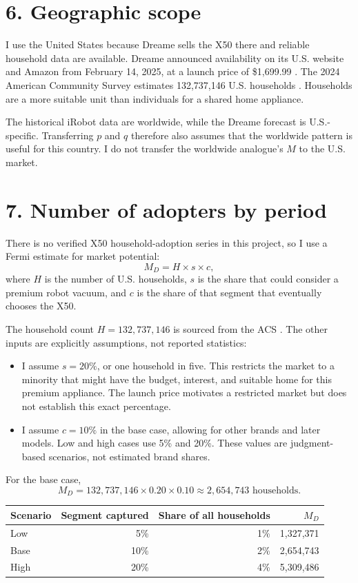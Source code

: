 \documentclass[11pt,a4paper]{article}
\begin{document}
\section*{6. Geographic scope}
I use the United States because Dreame sells the X50 there and reliable household data are available. Dreame announced availability on its U.S. website and Amazon from February 14, 2025, at a launch price of \$1,699.99 \cite{S18}. The 2024 American Community Survey estimates 132,737,146 U.S. households \cite{S17}. Households are a more suitable unit than individuals for a shared home appliance.

The historical iRobot data are worldwide, while the Dreame forecast is U.S.-specific. Transferring $p$ and $q$ therefore also assumes that the worldwide pattern is useful for this country. I do not transfer the worldwide analogue's $M$ to the U.S. market.

\section*{7. Number of adopters by period}
There is no verified X50 household-adoption series in this project, so I use a Fermi estimate for market potential:
\[
M_D=H\times s\times c,
\]
where $H$ is the number of U.S. households, $s$ is the share that could consider a premium robot vacuum, and $c$ is the share of that segment that eventually chooses the X50.

The household count $H=132{,}737{,}146$ is sourced from the ACS \cite{S17}. The other inputs are explicitly assumptions, not reported statistics:
\begin{itemize}
\item I assume $s=20\%$, or one household in five. This restricts the market to a minority that might have the budget, interest, and suitable home for this premium appliance. The launch price motivates a restricted market but does not establish this exact percentage.
\item I assume $c=10\%$ in the base case, allowing for other brands and later models. Low and high cases use 5\% and 20\%. These values are judgment-based scenarios, not estimated brand shares.
\end{itemize}

For the base case,
\[
M_D=132{,}737{,}146\times0.20\times0.10
\approx 2{,}654{,}743\text{ households}.
\]

\begin{center}
\begin{tabular}{lrrr}
\toprule
Scenario & Segment captured & Share of all households & $M_D$ \\
\midrule
Low & 5\% & 1\% & 1,327,371 \\
Base & 10\% & 2\% & 2,654,743 \\
High & 20\% & 4\% & 5,309,486 \\
\bottomrule
\end{tabular}
\end{center}
\end{document}
